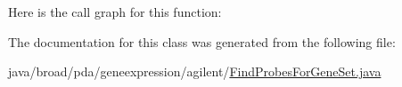 Here is the call graph for this function\+:




The documentation for this class was generated from the following file\+:\begin{DoxyCompactItemize}
\item 
java/broad/pda/geneexpression/agilent/\hyperlink{_find_probes_for_gene_set_8java}{Find\+Probes\+For\+Gene\+Set.\+java}\end{DoxyCompactItemize}
